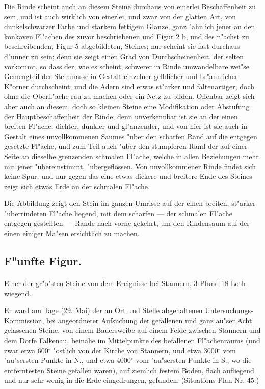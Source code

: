 \documentclass[a4paper, 11pt, oneside, german]{article}
\begin{document}
Die Rinde scheint auch an diesem Steine durchaus von einerlei Beschaffenheit zu sein, und ist auch wirklich von einerlei, und zwar von der glatten Art, von dunkelschwarzer Farbe und starkem fettigem Glanze, ganz "ahnlich jener an den konkaven Fl"achen des zuvor beschriebenen und Figur 2 b, und des n"achst zu beschreibenden, Figur 5 abgebildeten, Steines; nur scheint sie fast durchaus d"unner zu sein; denn sie zeigt einen Grad von Durchscheinenheit, der selten vorkommt, so dass der, wie es scheint, schwerer in Rinde umwandelbare wei"se Gemengteil der Steinmasse in Gestalt einzelner gelblicher und br"aunlicher K"orner durchscheint; und die Adern sind etwas st"arker und faltenartiger, doch ohne die Oberfl"ache rau zu machen oder ein Netz zu bilden. Offenbar zeigt sich aber auch an diesem, doch so kleinen Steine eine Modifikation oder Abstufung der Hauptbeschaffenheit der Rinde; denn unverkennbar ist sie an der einen breiten Fl"ache, dichter, dunkler und gl"anzender, und von hier ist sie auch in Gestalt eines unvollkommenen Saumes "uber den scharfen Rand auf die entgegen gesetzte Fl"ache, und zum Teil auch "uber den stumpferen Rand der auf einer Seite an dieselbe grenzenden schmalen Fl"ache, welche in allen Beziehungen mehr mit jener "ubereinstimmt, "ubergeflossen. Von unvollkommener Rinde findet sich keine Spur, und nur gegen das eine etwas dickere und breitere Ende des Steines zeigt sich etwas Erde an der schmalen Fl"ache.

Die Abbildung zeigt den Stein im ganzen Umrisse auf der einen breiten, st"arker "uberrindeten Fl"ache liegend, mit dem scharfen --- der schmalen Fl"ache entgegen gestellten --- Rande nach vorne gekehrt, um den Rindensaum auf der einen einiger Ma"sen ersichtlich zu machen.

\subsection{F"unfte Figur.}
\paragraph{}
Einer der gr"o"sten Steine von dem Ereignisse bei Stannern, 3 Pfund 18 Loth wiegend.

Er ward am Tage (29. Mai) der an Ort und Stelle abgehaltenen Untersuchungs-Kommission, bei angeordneter Aufsuchung der gefallenen und ganz au"ser Acht gelassenen Steine, von einem Bauersweibe auf einem Felde zwischen Stannern und dem Dorfe Falkenau, beinahe im Mittelpunkte des befallenen Fl"achenraums (und zwar etwa 600$^{\circ}$ "ostlich von der Kirche von Stannern, und etwa 3000$^{\circ}$ vom "au"sersten Punkte in N., und etwa 4000$^{\circ}$ vom "au"sersten Punkte in S., wo die entferntesten Steine gefallen waren), auf ziemlich festem Boden, flach aufliegend und nur sehr wenig in die Erde eingedrungen, gefunden. (Situations-Plan Nr. 45.)
\end{document}
